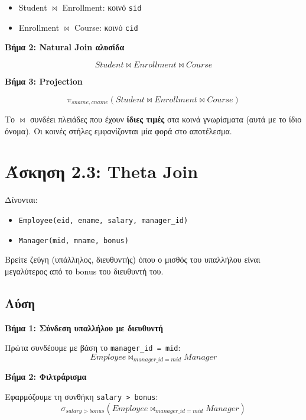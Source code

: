 \begin{itemize}
    \item Student $\bowtie$ Enrollment: κοινό \texttt{sid}
    \item Enrollment $\bowtie$ Course: κοινό \texttt{cid}
\end{itemize}

\textbf{Βήμα 2: Natural Join αλυσίδα}

$$Student \bowtie Enrollment \bowtie Course$$

\textbf{Βήμα 3: Projection}

$$\pi_{sname, cname}(Student \bowtie Enrollment \bowtie Course)$$

\begin{infobox}
Το $\bowtie$ συνδέει πλειάδες που έχουν \textbf{ίδιες τιμές} στα κοινά γνωρίσματα
(αυτά με το ίδιο όνομα). Οι κοινές στήλες εμφανίζονται μία φορά στο αποτέλεσμα.
\end{infobox}

\section{Άσκηση 2.3: Theta Join}

\begin{formulabox}[Εκφώνηση]
Δίνονται:
\begin{itemize}
    \item \texttt{Employee(eid, ename, salary, manager\_id)}
    \item \texttt{Manager(mid, mname, bonus)}
\end{itemize}

Βρείτε ζεύγη (υπάλληλος, διευθυντής) όπου ο μισθός του υπαλλήλου είναι
μεγαλύτερος από το bonus του διευθυντή του.
\end{formulabox}

\subsection*{Λύση}

\textbf{Βήμα 1: Σύνδεση υπαλλήλου με διευθυντή}

Πρώτα συνδέουμε με βάση το \texttt{manager\_id = mid}:
$$Employee \bowtie_{manager\_id = mid} Manager$$

\textbf{Βήμα 2: Φιλτράρισμα}

Εφαρμόζουμε τη συνθήκη \texttt{salary > bonus}:
$$\sigma_{salary > bonus}(Employee \bowtie_{manager\_id = mid} Manager)$$

